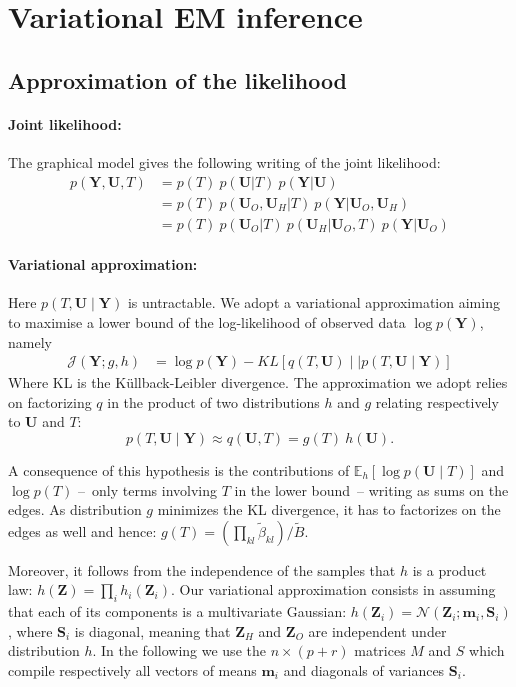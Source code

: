 \documentclass[11pt,a4paper]{article}
\newcommand{\Ybf}{\boldsymbol{Y}}
\newcommand{\Zbf}{\boldsymbol{Z}}
\newcommand{\Ubf}{\boldsymbol{U}}
\newcommand{\Sbf}{\boldsymbol{S}}
\newcommand{\mbf}{\boldsymbol{m}}
\newcommand\Ncal{\mathcal{N}}
\newcommand{\Esp}{\mathds{E}}
\begin{document}
 \section{Variational EM inference}
\subsection{Approximation of the likelihood}
\paragraph{Joint likelihood:}
The graphical model gives the following writing of the joint likelihood:
\begin{align*}
p(\Ybf,\Ubf,T)& = p(T) \: p(\Ubf|T) \: p(\Ybf|\Ubf) \\
&= p(T)\: p(\Ubf_O,\Ubf_H|T) \: p(\Ybf|\Ubf_O,\Ubf_H) \\
&= p(T) \: p(\Ubf_O|T) \: p(\Ubf_H | \Ubf_O,T)  \: p(\Ybf|\Ubf_O)
\end{align*} 


\paragraph{Variational approximation:}

Here $p(T,\Ubf \mid \Ybf)$ is untractable. We adopt a variational approximation aiming to maximise a lower bound of the log-likelihood of observed data $\log p(\Ybf)$, namely  
\begin{align*}
    \mathcal{J}(\Ybf; g,h)
    & = \log p(\Ybf) - KL\left[q(T,\Ubf) \mid\mid p(T,\Ubf \mid \Ybf)\right]
\end{align*}
Where KL is the Küllback-Leibler divergence. The approximation we adopt relies on factorizing $q$ in the product of two distributions $h$ and $g$ relating respectively to $\Ubf$  and $T$: 
$$p(T,\Ubf \mid\Ybf) \approx  q(\Ubf,T) = g(T)\:h(\Ubf).$$

 A consequence of this hypothesis is the contributions of   $\Esp_h[\log p(\Ubf\mid T)]$ and $\log p(T)$ --~only terms involving $T$ in the lower bound~-- writing as sums on the edges. As distribution   $g$ minimizes the KL divergence, it has to factorizes on the edges as well and hence:
$ g(T) = \left(\prod_{kl} \widetilde{\beta}_{kl} \right) / \widetilde{B}$. 

Moreover, it follows from the independence of the samples that $h$ is a product law: $ h(\Zbf) = \prod_i h_i(\Zbf_i)$.
Our variational approximation consists in assuming that each of its components is a multivariate Gaussian: $h(\Zbf_i) = \Ncal(\Zbf_i; \mbf_i, \Sbf_i)$, where $\Sbf_i$ is diagonal, meaning that $\Zbf_H$ and $\Zbf_O$ are independent under distribution $h$.  In the following we use the  $n\times (p+r)$ matrices $M$ and $S$ which compile respectively all vectors of means $\mbf_i$ and diagonals of variances $\Sbf_i$.
\end{document}

